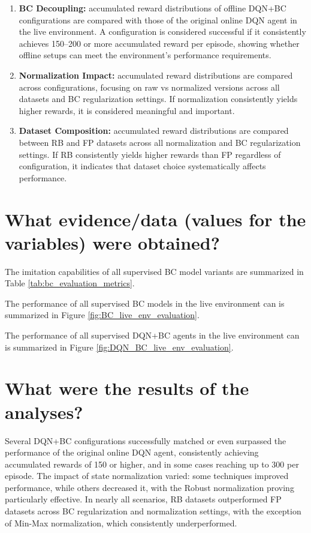 \begin{enumerate}
    \item \textbf{BC Decoupling:} accumulated reward distributions of offline DQN+BC configurations are compared with those of the original online DQN agent in the live environment. A configuration is considered successful if it consistently achieves 150–200 or more accumulated reward per episode, showing whether offline setups can meet the environment’s performance requirements.

    \item \textbf{Normalization Impact:} accumulated reward distributions are compared across configurations, focusing on raw vs normalized versions across all datasets and BC regularization settings. If normalization consistently yields higher rewards, it is considered meaningful and important.

    \item \textbf{Dataset Composition:} accumulated reward distributions are compared between RB and FP datasets across all normalization and BC regularization settings. If RB consistently yields higher rewards than FP regardless of configuration, it indicates that dataset choice systematically affects performance.
\end{enumerate}



\section{What evidence/data (values for the variables) were obtained?}
The imitation capabilities of all supervised  BC model variants are summarized in Table \ref{tab:bc_evaluation_metrics}.

The performance of all supervised BC models in the live environment can is summarized in Figure \ref{fig:BC_live_env_evaluation}.

The performance of all supervised DQN+BC agents in the live environment can is summarized in Figure \ref{fig:DQN_BC_live_env_evaluation}.


\section{What were the results of the analyses?}
Several DQN+BC configurations successfully matched or even surpassed the performance of the original online DQN agent, consistently achieving accumulated rewards of 150 or higher, and in some cases reaching up to 300 per episode. The impact of state normalization varied: some techniques improved performance, while others decreased it, with the Robust normalization proving particularly effective. In nearly all scenarios, RB datasets outperformed FP datasets across BC regularization and normalization settings, with the exception of Min-Max normalization, which consistently underperformed.


